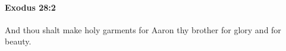 
		\paragraph{Exodus 28:2} %
			\label{EXODUS-28-2}

			And thou shalt make holy garments for Aaron thy brother for glory and for beauty.


